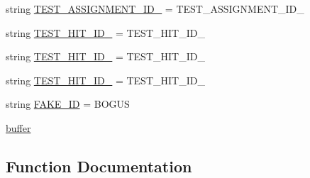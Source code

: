 \begin{DoxyCompactItemize}
string \hyperlink{namespaceparlai_1_1mturk_1_1core_1_1legacy__2018_1_1test_1_1test__mturk__manager_ae074725594aaf4b0b73ecb072115fac1}{T\+E\+S\+T\+\_\+\+A\+S\+S\+I\+G\+N\+M\+E\+N\+T\+\_\+\+I\+D\+\_} = \textquotesingle{}T\+E\+S\+T\+\_\+\+A\+S\+S\+I\+G\+N\+M\+E\+N\+T\+\_\+\+I\+D\+\_\textquotesingle{}
\item 
string \hyperlink{namespaceparlai_1_1mturk_1_1core_1_1legacy__2018_1_1test_1_1test__mturk__manager_a0c8b3ea3b577e5dee556d0d552a3aa69}{T\+E\+S\+T\+\_\+\+H\+I\+T\+\_\+\+I\+D\+\_} = \textquotesingle{}T\+E\+S\+T\+\_\+\+H\+I\+T\+\_\+\+I\+D\+\_\textquotesingle{}
\item 
string \hyperlink{namespaceparlai_1_1mturk_1_1core_1_1legacy__2018_1_1test_1_1test__mturk__manager_ad320f424203f5560cf132200762ff388}{T\+E\+S\+T\+\_\+\+H\+I\+T\+\_\+\+I\+D\+\_} = \textquotesingle{}T\+E\+S\+T\+\_\+\+H\+I\+T\+\_\+\+I\+D\+\_\textquotesingle{}
\item 
string \hyperlink{namespaceparlai_1_1mturk_1_1core_1_1legacy__2018_1_1test_1_1test__mturk__manager_a0fe68821eb1fdf4520a2cfbef39127b2}{T\+E\+S\+T\+\_\+\+H\+I\+T\+\_\+\+I\+D\+\_} = \textquotesingle{}T\+E\+S\+T\+\_\+\+H\+I\+T\+\_\+\+I\+D\+\_\textquotesingle{}
\item 
string \hyperlink{namespaceparlai_1_1mturk_1_1core_1_1legacy__2018_1_1test_1_1test__mturk__manager_ac5fac57e4baf86fac5be3eb0a6630947}{F\+A\+K\+E\+\_\+\+ID} = \textquotesingle{}B\+O\+G\+US\textquotesingle{}
\item 
\hyperlink{namespaceparlai_1_1mturk_1_1core_1_1legacy__2018_1_1test_1_1test__mturk__manager_a363c6414176957f50bd48e50de767397}{buffer}
\end{DoxyCompactItemize}


\subsection{Function Documentation}
\mbox{\label{namespaceparlai_1_1mturk_1_1core_1_1legacy__2018_1_1test_1_1test__mturk__manager_a169c67595e7065af1ba41705ed2dbff0}} 
